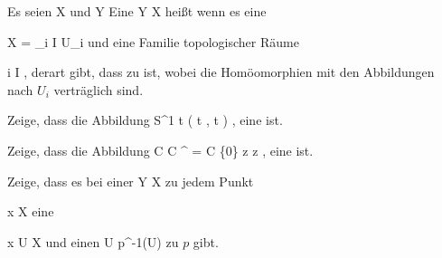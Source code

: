 \setcounter{section}{6}








Es seien
\mathkor {} {X} {und} {Y} {}
Eine
 { Y } { X
} {}
heißt
wenn es eine

\mavergleichskette
{\vergleichskette
{X
}
{ = }{\bigcup_{i \in I} U_i
}
{  }{
}
{    }{
}
{   }{
}
}
{}{}{}
und eine Familie
topologischer Räume

 {}
 {i \in I} {}
 {} {} {} {,}
derart gibt, dass
zu
 {} {}
ist, wobei die Homöomorphien mit den Abbildungen nach $U_i$ verträglich sind.







{}
{





Zeige, dass die Abbildung
\maabbeledisp {} {\R } { S^1
} { t } { \left(  \cos  t , \sin  t  \right)
} {,}
eine
ist.





}
{} {}

{}
{





Zeige, dass die Abbildung
\maabbeledisp {} { {\mathbb C} } { {\mathbb C} ^{\times} = {\mathbb C} \setminus \{0\}
} { z } { \exp  z
} {,}
eine
ist.





}
{} {}

{}
{





Zeige, dass es bei einer
 { Y } { X
} {}
zu jedem Punkt

\mavergleichskette
{\vergleichskette
{ x
}
{ \in }{ X
}
{  }{
}
{    }{
}
{   }{
}
}
{}{}{}
eine

\mavergleichskette
{\vergleichskette
{ x
}
{ \in }{ U
}
{ \subseteq }{ X
}
{    }{
}
{   }{
}
}
{}{}{}
und einen
 { U } { p^{-1}(U)
} {}
zu $p$ gibt.





}
{} {}

